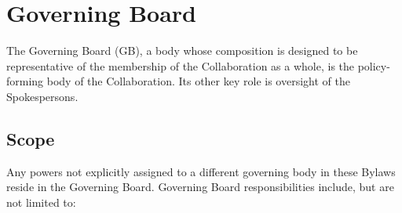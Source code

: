 \documentclass[12pt]{article}
\begin{document}
\section{Governing Board}

The Governing Board (GB), a body whose composition is designed to be representative of the membership of the Collaboration as a whole, is the policy-forming body of the Collaboration.  Its other key role is oversight of the Spokespersons.

\subsection{Scope}

Any powers not explicitly assigned to a different governing body in these Bylaws reside in the Governing Board. Governing Board responsibilities include, but are not limited to:
\end{document}
